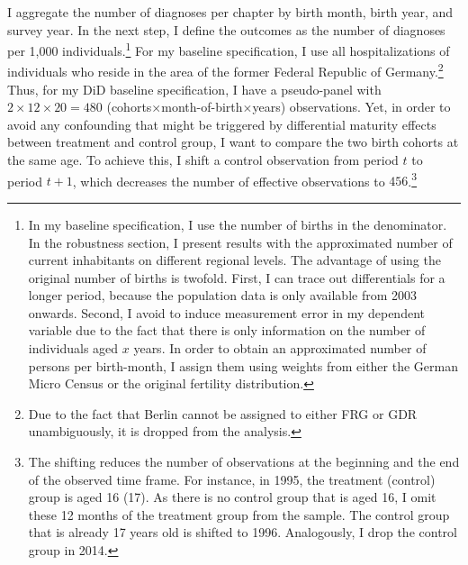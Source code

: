 \documentclass[11pt, a4paper,draft]{article} %
\begin{document}
I aggregate the number of diagnoses per chapter by birth month, birth year, and survey year. In the next step, I define the outcomes as the number of diagnoses per 1,000 individuals.\footnote{In my baseline specification, I use the number of births in the denominator. In the robustness section, I present results with the approximated number of current inhabitants on different regional levels. The advantage of using the original number of births is twofold. First, I can trace out differentials for a longer period, because the population data is only available from 2003 onwards. Second, I avoid to induce measurement error in my dependent variable due to the fact that there is only information on the number of individuals aged $x$ years. In order to obtain an approximated number of persons per birth-month, I assign them using weights from either the German Micro Census or the original fertility distribution.} For my baseline specification, I use all hospitalizations of individuals who reside in the area of the former Federal Republic of Germany.\footnote{Due to the fact that Berlin cannot be assigned to either FRG or GDR unambiguously, it is dropped from the analysis.} Thus, for my DiD baseline specification, I have a pseudo-panel with $2\times12\times20=480$ (cohorts$\times$month-of-birth$\times$years) observations. Yet, in order to avoid any confounding that might be triggered by differential maturity effects between treatment and control group, I want to compare the two birth cohorts at the same age. To achieve this, I shift a control observation from period $t$ to period $t+1$, which decreases the number of effective observations to $456$.\footnote{The shifting reduces the number of observations at the beginning and the end of the observed time frame. For instance, in 1995, the treatment (control) group is aged 16 (17). As there is no control group that is aged 16, I omit these 12 months of the treatment group from the sample. The control group that is already 17 years old is shifted to 1996. Analogously, I drop the control group in 2014.} \newline %

\end{document}

